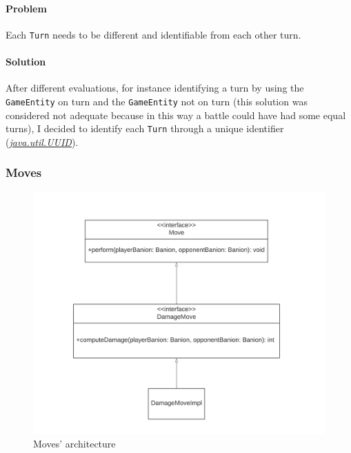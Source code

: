 \documentclass[12pt, a4paper]{report}
\begin{document}
            \paragraph{Problem}

            Each \verb|Turn| needs to be different and identifiable from each other turn.

            \paragraph{Solution}

            After different evaluations, for instance identifying a turn by using the \verb|GameEntity| on turn and the \verb|GameEntity|
            not on turn (this solution was considered not adequate because in this way a battle could have had some equal turns),
            I decided to identify each \verb|Turn| through a unique identifier
            (\href{https://docs.oracle.com/en/java/javase/17/docs/api/java.base/java/util/UUID.html}{\textit{java.util.UUID}}).

        \subsubsection{Moves}

            \begin{figure}[H]
                \centering{}
                \caption{Moves' architecture}
                \includegraphics[width=\textwidth]{moves}
            \end{figure}
        
\end{document}
